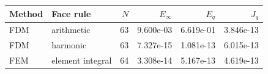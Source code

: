 \begin{tabular}{llrrrr}
\toprule
Method & Face rule & $N$ & $E_\infty$ & $E_q$ & $J_q$\\
\midrule
FDM & arithmetic & 63 & 9.600e-03 & 6.619e-01 & 3.846e-13\\
FDM & harmonic & 63 & 7.327e-15 & 1.081e-13 & 6.015e-13\\
FEM & element integral & 64 & 3.308e-14 & 5.167e-13 & 4.619e-13\\
\bottomrule
\end{tabular}
